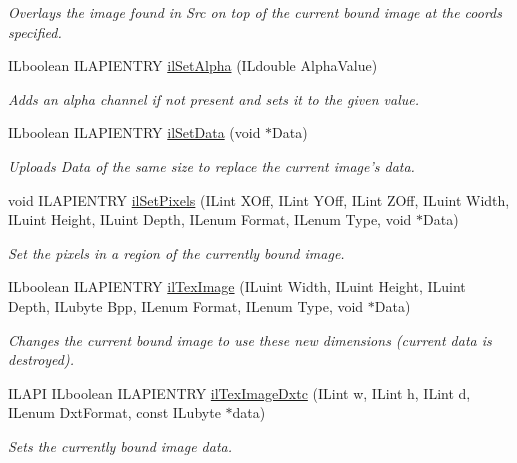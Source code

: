 \begin{DoxyCompactItemize}
\begin{DoxyCompactList}\small\item\em Overlays the image found in Src on top of the current bound image at the coords specified. \end{DoxyCompactList}\item 
I\+Lboolean I\+L\+A\+P\+I\+E\+N\+T\+R\+Y \hyperlink{group__image__manip_ga8887f494b3ed8dc889e783d5e3e3865f}{il\+Set\+Alpha} (I\+Ldouble Alpha\+Value)
\begin{DoxyCompactList}\small\item\em Adds an alpha channel if not present and sets it to the given value. \end{DoxyCompactList}\item 
I\+Lboolean I\+L\+A\+P\+I\+E\+N\+T\+R\+Y \hyperlink{group__image__manip_ga0f4d316f0aa3420fae6817cd8b8c6a7c}{il\+Set\+Data} (void $\ast$Data)
\begin{DoxyCompactList}\small\item\em Uploads Data of the same size to replace the current image's data. \end{DoxyCompactList}\item 
\hypertarget{group__image__manip_gacbb2f4de541d3ea64b2ef079bb78e724}{void I\+L\+A\+P\+I\+E\+N\+T\+R\+Y \hyperlink{group__image__manip_gacbb2f4de541d3ea64b2ef079bb78e724}{il\+Set\+Pixels} (I\+Lint X\+Off, I\+Lint Y\+Off, I\+Lint Z\+Off, I\+Luint Width, I\+Luint Height, I\+Luint Depth, I\+Lenum Format, I\+Lenum Type, void $\ast$Data)}\label{group__image__manip_gacbb2f4de541d3ea64b2ef079bb78e724}

\begin{DoxyCompactList}\small\item\em Set the pixels in a region of the currently bound image. \end{DoxyCompactList}\item 
I\+Lboolean I\+L\+A\+P\+I\+E\+N\+T\+R\+Y \hyperlink{group__image__manip_ga4a0b02cccd4ccb9c863235fbfdb646eb}{il\+Tex\+Image} (I\+Luint Width, I\+Luint Height, I\+Luint Depth, I\+Lubyte Bpp, I\+Lenum Format, I\+Lenum Type, void $\ast$Data)
\begin{DoxyCompactList}\small\item\em Changes the current bound image to use these new dimensions (current data is destroyed). \end{DoxyCompactList}\item 
I\+L\+A\+P\+I I\+Lboolean I\+L\+A\+P\+I\+E\+N\+T\+R\+Y \hyperlink{group__image__manip_ga7be29284583785797fbda3b49a939975}{il\+Tex\+Image\+Dxtc} (I\+Lint w, I\+Lint h, I\+Lint d, I\+Lenum Dxt\+Format, const I\+Lubyte $\ast$data)
\begin{DoxyCompactList}\small\item\em Sets the currently bound image data. \end{DoxyCompactList}\end{DoxyCompactItemize}


